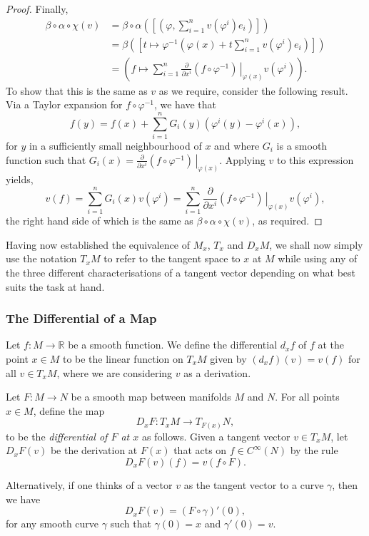 \begin{proof}
Finally,
\begin{align*}
\beta\circ\alpha\circ\chi(v)&=\beta\circ\alpha\left( \left[ \left( \varphi,\sum_{i=1}^{n}v(\varphi^i)e_i \right) \right] \right)\\
&=\beta\left( \left[ t\mapsto \varphi^{-1}\left( \varphi(x)+t\sum_{i=1}^nv(\varphi^i)e_i \right) \right] \right)\\
&=\left( f\mapsto\sum_{i=1}^n\frac{\partial}{\partial x^i}\left.(f\circ\varphi^{-1})\,\right\rvert_{\varphi(x)}v(\varphi^i) \right).
\end{align*}
To show that this is the same as $v$ as we require, consider the following result. Via a Taylor expansion for $f\circ\varphi^{-1}$, we have that
\[
f(y)=f(x)+\sum_{i=1}^nG_i(y)\left(\varphi^i(y)-\varphi^i(x)\right),
\]
for $y$ in a sufficiently small neighbourhood of $x$ and where $G_i$ is a smooth function such that $G_i(x)=\frac{\partial}{\partial x^i}\left. (f\circ\varphi^{-1})\,\right\rvert_{\varphi(x)}$. Applying $v$ to this expression yields,
\begin{equation}
v(f)=\sum_{i=1}^{n}G_i(x)v(\varphi^i)=\sum_{i=1}^n\frac{\partial}{\partial x^i}\left.(f\circ\varphi^{-1})\,\right\rvert_{\varphi(x)}v(\varphi^i),
\label{eq:vf-detail-1}
\end{equation}
the right hand side of which is the same as $\beta\circ\alpha\circ\chi(v)$, as required.
\end{proof}
Having now established the equivalence of $M_x$, $T_x$ and $D_xM$, we shall now simply use the notation $T_xM$ to refer to the tangent space to $x$ at $M$ while using any of the three different characterisations of a tangent vector depending on what best suits the task at hand.
\subsubsection{The Differential of a Map}
\begin{definition}
Let $f:M\to\mathbb{R}$ be a smooth function. We define the differential $d_xf$ of $f$ at the point $x\in M$ to be the linear function on $T_xM$ given by $(d_xf)(v)=v(f)$ for all $v\in T_xM$, where we are considering $v$ as a derivation. 

Let $F:M\to N$ be a smooth map between manifolds $M$ and $N$. For all points $x\in M$, define the map
\[
D_xF:T_xM\to T_{F(x)}N,
\]
to be the \textit{differential of $F$ at $x$} as follows. Given a tangent vector $v\in T_xM$, let $D_xF(v)$ be the derivation at $F(x)$ that acts on $f\in C^{\infty}(N)$ by the rule
\[
D_xF(v)(f)=v(f\circ F).
\]
\end{definition}
Alternatively, if one thinks of a vector $v$ as the tangent vector to a curve $\gamma$, then we have
\[
D_xF(v)=(F\circ\gamma)'(0),
\] 
for any smooth curve $\gamma$ such that $\gamma(0)=x$ and $\gamma'(0)=v$.

